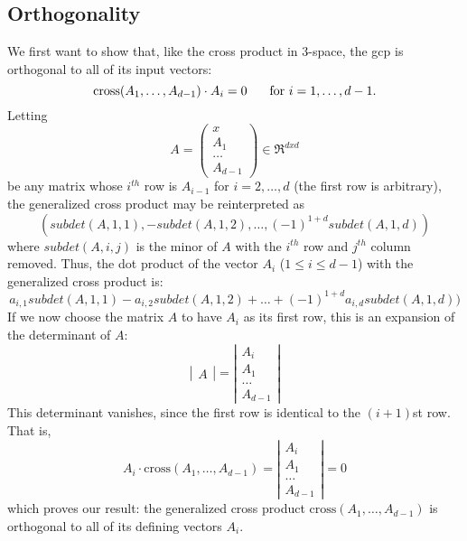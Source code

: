 \documentclass[10pt]{article}
\begin{document}
\clearpage

\subsection{Orthogonality}

We first want to show that, like the cross product in 3-space, 
the gcp is orthogonal to all of its input vectors:
\[
\mbox{cross}(A_1,\ldots,A_{d-1}) \cdot A_i = 0 \hspace{.2in} \mbox{ for } i=1,\ldots,d-1.
\]
Letting 
\[
A = \left(
\begin{array}{c}
x \\ A_1 \\ \ldots \\ A_{d-1}
\end{array}
\right)
\in \Re^{dxd}
\]
be any matrix whose $i^{th}$ row is $A_{i-1}$ for $i=2,\ldots,d$
(the first row is arbitrary),
the generalized cross product may be reinterpreted as 
\[ 
(subdet(A,1,1), -subdet(A,1,2), \ldots, (-1)^{1+d} subdet(A,1,d))
\]
where $subdet(A,i,j)$ is the minor of $A$ with the $i^{th}$ row and $j^{th}$
column removed.
Thus, the dot product of the vector $A_i$ ($1 \leq i \leq d-1$) 
with the generalized cross product is:
\[
a_{i,1} subdet(A,1,1) - a_{i,2} subdet(A,1,2) + \ldots + (-1)^{1+d} a_{i,d} subdet(A,1,d))
\]
If we now choose the matrix $A$ to have $A_i$ as its first row,
this is an expansion of the determinant of $A$:
\[
\left|
\begin{array}{c}
A
\end{array}
\right|
=
\left|
\begin{array}{c}
A_i \\ A_1 \\ \ldots \\ A_{d-1}
\end{array}
\right|
\]
This determinant vanishes, since the first row is identical to the $(i+1)$st row.
That is, 
\[
A_i \cdot \mbox{cross}(A_1,\ldots,A_{d-1})
=
\left|
\begin{array}{c}
A_i \\ A_1 \\ \ldots \\ A_{d-1}
\end{array}
\right| 
= 0
\]
which proves our result:
the generalized cross product $\mbox{cross}(A_1,\ldots,A_{d-1})$ 
is orthogonal to all of its defining vectors $A_i$.

\end{document}
